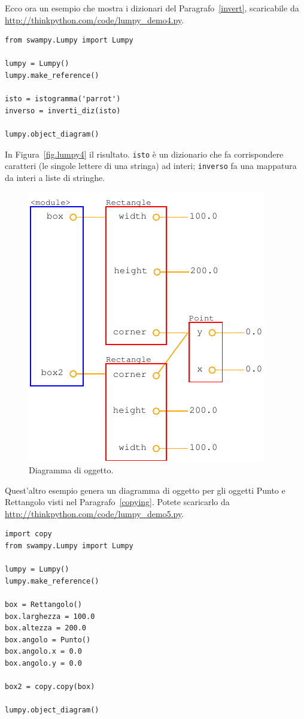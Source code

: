 \documentclass[10pt]{book}
\begin{document}
Ecco ora un esempio che mostra i dizionari del Paragrafo~\ref{invert}, scaricabile da \url{http://thinkpython.com/code/lumpy_demo4.py}.

\begin{verbatim}
from swampy.Lumpy import Lumpy

lumpy = Lumpy()
lumpy.make_reference()

isto = istogramma('parrot')
inverso = inverti_diz(isto)

lumpy.object_diagram()
\end{verbatim}

In Figura~\ref{fig.lumpy4} il risultato.  {\tt isto} è un dizionario che fa corrispondere caratteri (le singole lettere di una stringa) ad interi; 
{\tt inverso} fa una mappatura da interi a liste di stringhe.

\begin{figure}
\centerline
{\includegraphics[scale=0.7]{figs/lumpydemo5.pdf}}
\caption{Diagramma di oggetto.}
\label{fig.lumpy5}
\end{figure}

Quest'altro esempio genera un diagramma di oggetto per gli oggetti Punto e Rettangolo visti nel Paragrafo~\ref{copying}.  Potete scaricarlo da
\url{http://thinkpython.com/code/lumpy_demo5.py}.

\begin{verbatim}
import copy
from swampy.Lumpy import Lumpy

lumpy = Lumpy()
lumpy.make_reference()

box = Rettangolo()
box.larghezza = 100.0
box.altezza = 200.0
box.angolo = Punto()
box.angolo.x = 0.0
box.angolo.y = 0.0

box2 = copy.copy(box)

lumpy.object_diagram()
\end{verbatim}
\end{document}
